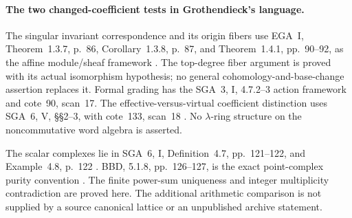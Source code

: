 \paragraph{The two changed-coefficient tests in Grothendieck's language.}
The singular invariant correspondence and its origin
fibers use EGA~I, Theorem~1.3.7, p.~86,
Corollary~1.3.8, p.~87, and Theorem~1.4.1,
pp.~90--92, as the affine module/sheaf framework
\cite{EGA}. The top-degree fiber argument is proved
with its actual isomorphism hypothesis; no general
cohomology-and-base-change assertion replaces it.
Formal grading has the SGA~3, I, 4.7.2--3 action
framework and cote~90, scan~17. The effective-versus-virtual
coefficient distinction uses SGA~6, V, \S\S2--3,
with cote~133, scan~18 \cite{SGA3,SGA6,Archive}.
No \(\lambda\)-ring structure on the noncommutative
word algebra is asserted.

The scalar complexes lie in SGA~6, I,
Definition~4.7, pp.~121--122, and Example~4.8,
p.~122 \cite{SGA6}. BBD, 5.1.8, pp.~126--127,
is the exact point-complex purity convention
\cite{BBD}. The finite power-sum uniqueness and
integer multiplicity contradiction are proved here.
The additional arithmetic comparison is not supplied
by a source canonical lattice or an unpublished
archive statement.
